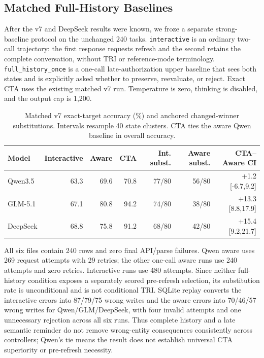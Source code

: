 \documentclass[10pt]{article}
\begin{document}
\subsection{Matched Full-History Baselines}
After the v7 and DeepSeek results were known, we froze a separate strong-baseline protocol on the
unchanged 240 tasks. \texttt{interactive} is an ordinary two-call trajectory: the first response
requests refresh and the second retains the complete conversation, without TRI or reference-mode
terminology. \texttt{full\_history\_once} is a one-call late-authorization upper baseline that sees both
states and is explicitly asked whether to preserve, reevaluate, or reject. Exact CTA uses the
existing matched v7 run. Temperature is zero, thinking is disabled, and the output cap is 1,200.

\begin{table}[h]
\centering
\scriptsize
\setlength{\tabcolsep}{3pt}
\begin{tabular}{lrrrrrr}
\toprule
Model & Interactive & Aware & CTA & Int. subst. & Aware subst. & CTA--Aware CI \\
\midrule
Qwen3.5 & 63.3 & 69.6 & 70.8 & 77/80 & 56/80 & +1.2 [-6.7,9.2] \\
GLM-5.1 & 67.1 & 80.8 & 94.2 & 74/80 & 38/80 & +13.3 [8.8,17.9] \\
DeepSeek & 68.8 & 75.8 & 91.2 & 68/80 & 42/80 & +15.4 [9.2,21.7] \\
\bottomrule
\end{tabular}
\caption{Matched v7 exact-target accuracy (\%) and anchored changed-winner substitutions.
Intervals resample 40 state clusters. CTA ties the aware Qwen baseline in overall accuracy.}
\end{table}

All six files contain 240 rows and zero final API/parse failures. Qwen aware uses 269 request
attempts with 29 retries; the other one-call aware runs use 240 attempts and zero retries.
Interactive runs use 480 attempts. Since neither full-history condition exposes a separately
scored pre-refresh selection, its substitution rate is unconditional and is not conditional TRI.
SQLite replay converts the interactive errors into 87/79/75 wrong writes and the aware errors
into 70/46/57 wrong writes for Qwen/GLM/DeepSeek, with four invalid attempts and one unnecessary
rejection across all six runs. Thus complete history and a late semantic reminder do not remove
wrong-entity consequences consistently across controllers; Qwen's tie means the result does not
establish universal CTA superiority or pre-refresh necessity.
\end{document}
